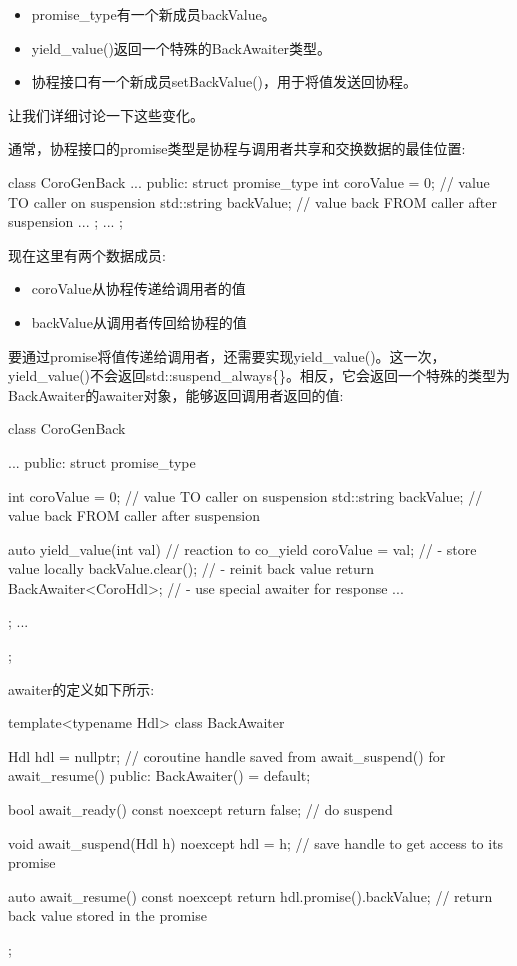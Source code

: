 \begin{itemize}
\item
promise\_type有一个新成员backValue。

\item
yield\_value()返回一个特殊的BackAwaiter类型。

\item
协程接口有一个新成员setBackValue()，用于将值发送回协程。
\end{itemize}

让我们详细讨论一下这些变化。


通常，协程接口的promise类型是协程与调用者共享和交换数据的最佳位置:

\begin{cpp}
class CoroGenBack {
	...
	public:
	struct promise_type {
		int coroValue = 0; // value TO caller on suspension
		std::string backValue; // value back FROM caller after suspension
		...
	};
	...
};
\end{cpp}

现在这里有两个数据成员:

\begin{itemize}
\item
coroValue从协程传递给调用者的值

\item
backValue从调用者传回给协程的值
\end{itemize}


要通过promise将值传递给调用者，还需要实现yield\_value()。这一次，yield\_value()不会返回std::suspend\_always\{\}。相反，它会返回一个特殊的类型为BackAwaiter的awaiter对象，能够返回调用者返回的值:

\begin{cpp}
class CoroGenBack {
	...
	public:
	struct promise_type {
		int coroValue = 0; // value TO caller on suspension
		std::string backValue; // value back FROM caller after suspension

		auto yield_value(int val) { // reaction to co_yield
			coroValue = val; // - store value locally
			backValue.clear(); // - reinit back value
			return BackAwaiter<CoroHdl>{}; // - use special awaiter for response
		}
		...
	};
	...
};
\end{cpp}

awaiter的定义如下所示:


\begin{cpp}
template<typename Hdl>
class BackAwaiter {
	Hdl hdl = nullptr; // coroutine handle saved from await_suspend() for await_resume()
	public:
	BackAwaiter() = default;

	bool await_ready() const noexcept {
		return false; // do suspend
	}

	void await_suspend(Hdl h) noexcept {
		hdl = h; // save handle to get access to its promise
	}

	auto await_resume() const noexcept {
		return hdl.promise().backValue; // return back value stored in the promise
	}
};
\end{cpp}


